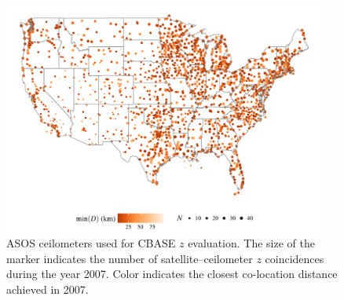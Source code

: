 \documentclass[essd,manuscript]{copernicus}\usepackage[]{graphicx}\usepackage[]{color}
\newenvironment{knitrout}{}{} %
\newcommand\CBH{\ensuremath{z}}
\begin{document}

\begin{figure}
  \centering
\begin{knitrout}
\color{fgcolor}

{\centering \includegraphics[width=0.95\textwidth]{figure/method-eval-asos-1} 

}



\end{knitrout}
  \caption{ASOS ceilometers used for CBASE \CBH{} evaluation.  The size of the
    marker indicates the number of satellite--ceilometer \CBH{} coincidences during
    the year 2007.  Color indicates the closest co-location distance achieved in
    2007.}
  \label{fig:asos}
\end{figure}
\end{document}
